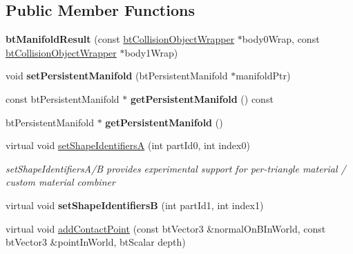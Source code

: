\subsection*{Public Member Functions}
\begin{DoxyCompactItemize}
\item 
\mbox{\label{classbtManifoldResult_a012034766365adbebc5a4430f6dfa955}} 
{\bfseries bt\+Manifold\+Result} (const \hyperlink{structbtCollisionObjectWrapper}{bt\+Collision\+Object\+Wrapper} $\ast$body0\+Wrap, const \hyperlink{structbtCollisionObjectWrapper}{bt\+Collision\+Object\+Wrapper} $\ast$body1\+Wrap)
\item 
\mbox{\label{classbtManifoldResult_a7a46d46b9a13c2896695e458c1d6df1f}} 
void {\bfseries set\+Persistent\+Manifold} (bt\+Persistent\+Manifold $\ast$manifold\+Ptr)
\item 
\mbox{\label{classbtManifoldResult_a222d8b2a5ee129b2c0bcad2eaa01d3ed}} 
const bt\+Persistent\+Manifold $\ast$ {\bfseries get\+Persistent\+Manifold} () const
\item 
\mbox{\label{classbtManifoldResult_a4e02b9721e32500c1af01fb775edf14e}} 
bt\+Persistent\+Manifold $\ast$ {\bfseries get\+Persistent\+Manifold} ()
\item 
\mbox{\label{classbtManifoldResult_a01f472fc7b6d431845d22f55842f029d}} 
virtual void \hyperlink{classbtManifoldResult_a01f472fc7b6d431845d22f55842f029d}{set\+Shape\+IdentifiersA} (int part\+Id0, int index0)
\begin{DoxyCompactList}\small\item\em set\+Shape\+Identifiers\+A/B provides experimental support for per-\/triangle material / custom material combiner \end{DoxyCompactList}\item 
\mbox{\label{classbtManifoldResult_a95a5dab38f08b08af1feb6756d60a681}} 
virtual void {\bfseries set\+Shape\+IdentifiersB} (int part\+Id1, int index1)
\item 
virtual void \hyperlink{classbtManifoldResult_aebe32f0c202d988d0458e88d768602c6}{add\+Contact\+Point} (const bt\+Vector3 \&normal\+On\+B\+In\+World, const bt\+Vector3 \&point\+In\+World, bt\+Scalar depth)

\end{DoxyCompactItemize}
